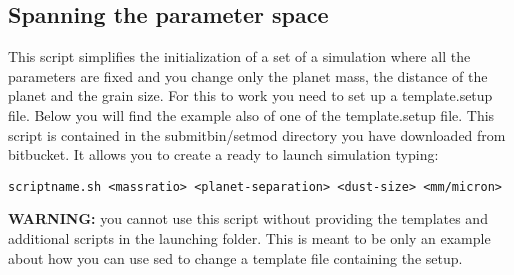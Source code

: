 \documentclass[10pt,a4paper,twoside]{article} %
\begin{document}
\subsection{Spanning the parameter space}\label{pspacespan}

This script simplifies the initialization of a set of a simulation where all the parameters are fixed and you change only the planet mass, the distance of the planet and the grain size. For this to work you need to set up a template.setup file. Below you will find the example also of one of the template.setup file. This script is contained in the submitbin/setmod directory you have downloaded from bitbucket.
It allows you to create a ready to launch simulation typing:
\begin{verbatim}
scriptname.sh <massratio> <planet-separation> <dust-size> <mm/micron>
\end{verbatim}
\textbf{WARNING:} you cannot use this script without providing the templates and additional scripts in the launching folder. This is meant to be only an example about how you can use sed to change a template file containing the setup.
\end{document}
